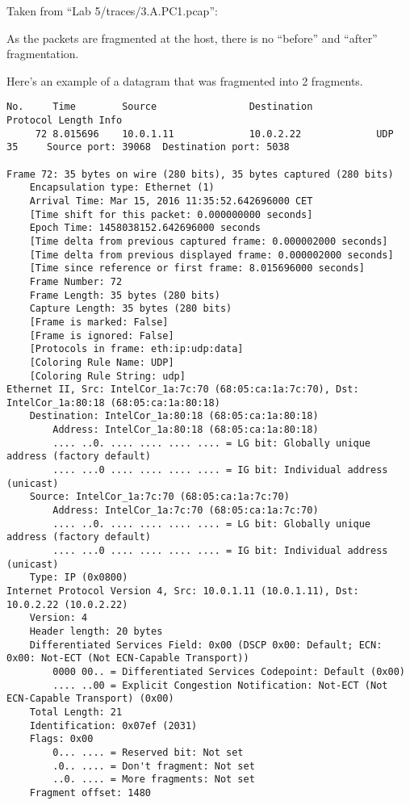 Taken from ``Lab 5/traces/3.A.PC1.pcap'':

As the packets are fragmented at the host, there is no ``before'' and ``after'' fragmentation.

Here's an example of a datagram that was fragmented into 2 fragments.
\begin{lstlisting}
No.     Time        Source                Destination           Protocol Length Info
     72 8.015696    10.0.1.11             10.0.2.22             UDP      35     Source port: 39068  Destination port: 5038

Frame 72: 35 bytes on wire (280 bits), 35 bytes captured (280 bits)
    Encapsulation type: Ethernet (1)
    Arrival Time: Mar 15, 2016 11:35:52.642696000 CET
    [Time shift for this packet: 0.000000000 seconds]
    Epoch Time: 1458038152.642696000 seconds
    [Time delta from previous captured frame: 0.000002000 seconds]
    [Time delta from previous displayed frame: 0.000002000 seconds]
    [Time since reference or first frame: 8.015696000 seconds]
    Frame Number: 72
    Frame Length: 35 bytes (280 bits)
    Capture Length: 35 bytes (280 bits)
    [Frame is marked: False]
    [Frame is ignored: False]
    [Protocols in frame: eth:ip:udp:data]
    [Coloring Rule Name: UDP]
    [Coloring Rule String: udp]
Ethernet II, Src: IntelCor_1a:7c:70 (68:05:ca:1a:7c:70), Dst: IntelCor_1a:80:18 (68:05:ca:1a:80:18)
    Destination: IntelCor_1a:80:18 (68:05:ca:1a:80:18)
        Address: IntelCor_1a:80:18 (68:05:ca:1a:80:18)
        .... ..0. .... .... .... .... = LG bit: Globally unique address (factory default)
        .... ...0 .... .... .... .... = IG bit: Individual address (unicast)
    Source: IntelCor_1a:7c:70 (68:05:ca:1a:7c:70)
        Address: IntelCor_1a:7c:70 (68:05:ca:1a:7c:70)
        .... ..0. .... .... .... .... = LG bit: Globally unique address (factory default)
        .... ...0 .... .... .... .... = IG bit: Individual address (unicast)
    Type: IP (0x0800)
Internet Protocol Version 4, Src: 10.0.1.11 (10.0.1.11), Dst: 10.0.2.22 (10.0.2.22)
    Version: 4
    Header length: 20 bytes
    Differentiated Services Field: 0x00 (DSCP 0x00: Default; ECN: 0x00: Not-ECT (Not ECN-Capable Transport))
        0000 00.. = Differentiated Services Codepoint: Default (0x00)
        .... ..00 = Explicit Congestion Notification: Not-ECT (Not ECN-Capable Transport) (0x00)
    Total Length: 21
    Identification: 0x07ef (2031)
    Flags: 0x00
        0... .... = Reserved bit: Not set
        .0.. .... = Don't fragment: Not set
        ..0. .... = More fragments: Not set
    Fragment offset: 1480

\end{lstlisting}
